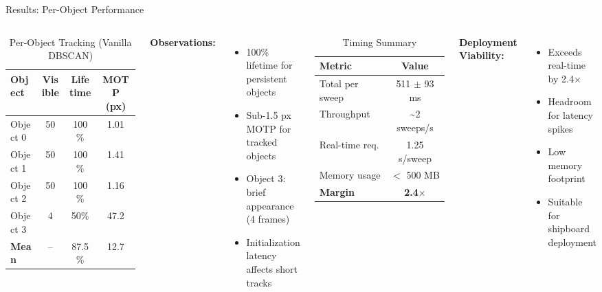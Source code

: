 \documentclass[aspectratio=169, 10pt]{beamer}
\begin{document}
\begin{frame}{Results: Per-Object Performance}
\begin{columns}[T]
\begin{table}
\centering
\small
\caption{Per-Object Tracking (Vanilla DBSCAN)}
\begin{tabular}{@{}lccc@{}}
\toprule
\textbf{Object} & \textbf{Visible} & \textbf{Lifetime} & \textbf{MOTP (px)} \\
\midrule
Object 0 & 50 & 100\% & 1.01 \\
Object 1 & 50 & 100\% & 1.41 \\
Object 2 & 50 & 100\% & 1.16 \\
Object 3 & 4 & 50\% & 47.2 \\
\midrule
\textbf{Mean} & -- & 87.5\% & 12.7 \\
\bottomrule
\end{tabular}
\end{table}

\vspace{0.3cm}
\textbf{Observations:}
\begin{itemize}
  \scriptsize
  \item \textcolor{Congaree}{100\% lifetime} for persistent objects
  \item \textcolor{Congaree}{Sub-1.5 px MOTP} for tracked objects
  \item Object 3: brief appearance (4 frames)
  \item Initialization latency affects short tracks
\end{itemize}

\begin{table}
\centering
\small
\caption{Timing Summary}
\begin{tabular}{@{}lc@{}}
\toprule
\textbf{Metric} & \textbf{Value} \\
\midrule
Total per sweep & 511 $\pm$ 93 ms \\
Throughput & \textasciitilde 2 sweeps/s \\
Real-time req. & 1.25 s/sweep \\
Memory usage & $<$ 500 MB \\
\midrule
\textbf{Margin} & \textbf{2.4$\times$} \\
\bottomrule
\end{tabular}
\end{table}

\vspace{0.3cm}
\textbf{Deployment Viability:}
\begin{itemize}
  \scriptsize
  \item Exceeds real-time by 2.4$\times$
  \item Headroom for latency spikes
  \item Low memory footprint
  \item Suitable for shipboard deployment
\end{itemize}
\end{columns}
\end{frame}
\end{document}
